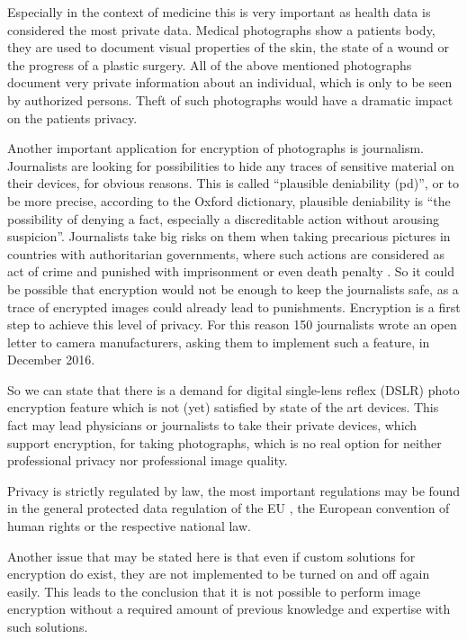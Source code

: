 \documentclass[12pt,a4paper,titlepage,oneside]{scrartcl}
\begin{document}
Especially in the context of medicine this is very important as health data is considered the most private data. \cite{williams2013}
Medical photographs show a patients body, they are used to document visual properties of the skin, the state of a wound or the progress of a plastic surgery. 
All of the above mentioned photographs document very private information about an individual, which is only to be seen by authorized persons.
Theft of such photographs would have a dramatic impact on the patients privacy.

Another important application for encryption of photographs is journalism.
Journalists are looking for possibilities to hide any traces of sensitive material on their devices, for obvious reasons.
This is called ``plausible deniability (pd)'', or to be more precise, according to the Oxford dictionary, plausible deniability is ``the possibility of denying a fact, especially a discreditable action without arousing suspicion''.\cite{OxforddictPlausibleDen}
Journalists take big risks on them when taking precarious pictures in countries with authoritarian governments, where such actions are considered as act of crime and punished with imprisonment or even death penalty \cite{Amnesty2016}.
So it could be possible that encryption would not be enough to keep the journalists safe, as a trace of encrypted images could already lead to punishments.
Encryption is a first step to achieve this level of privacy.
For this reason 150 journalists wrote an open letter to camera manufacturers, asking them to implement such a feature, in December 2016.\cite{fp2016}

So we can state that there is a demand for digital single-lens reflex (DSLR) photo encryption feature which is not (yet) satisfied by state of the art devices.
This fact may lead physicians or journalists to take their private devices, which support encryption, for taking photographs, which is no real option for neither professional privacy nor professional image quality.

Privacy is strictly regulated by law, the most important regulations may be found in the general protected data regulation of the EU \cite{EuropeanParliament2016}, the European convention of human rights \cite{EuropeanCourtofHumanRights2010} or the respective national law. \cite{EHG2015, DSG2000, ELGA2012}

Another issue that may  be stated here is that even if custom solutions for encryption do exist, they are not implemented to be turned on and off again easily.
This leads to the conclusion that it is not possible to perform image encryption without a required amount of previous knowledge and expertise with such solutions.
\end{document}

